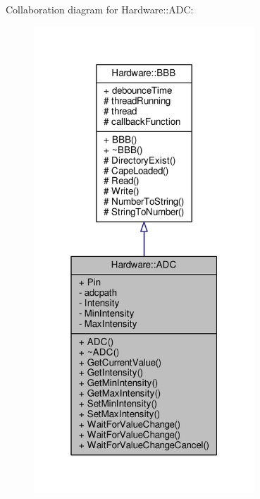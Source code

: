 Collaboration diagram for Hardware\+:\+:A\+D\+C\+:\nopagebreak
\begin{figure}[H]
\begin{center}
\leavevmode
\includegraphics[width=235pt]{class_hardware_1_1_a_d_c__coll__graph}
\end{center}
\end{figure}
